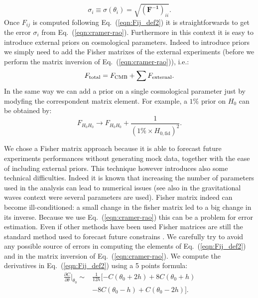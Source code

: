 \documentclass[aps,prd,reprint,superscriptaddress]{revtex4-1}
\newcommand\refeq[1]{Eq.~(\ref{eqn:#1})}
\begin{document}
\begin{equation}
\sigma_i \equiv \sigma (\theta_i) = \sqrt{(\mathbf{ F^{-1}})_{ii}}.
\label{eqn:cramer-rao}
\end{equation}
Once $F_{ij}$ is computed following \refeq{Fij_def2} it is straightforwards to get the error $\sigma_i$ from \refeq{cramer-rao}. Furthermore in this context it is easy to introduce external priors on cosmological parameters.
Indeed to introduce priors we simply need to add the Fisher matrixes of the external experiments (before we perform the matrix inversion of \refeq{cramer-rao}), i.e.:
\begin{equation}
F_{\rm total}=F_{\rm CMB}+\sum F_{\rm external}.
\end{equation}
In the same way we can add a prior on a single cosmological parameter just by modyfing the correspondent matrix element.
For example, a $1\%$ prior on $H_{0}$ can be obtained by:
\begin{equation}
F_{H_0 H_0} \rightarrow F_{H_0 H_0} + \frac{1}{(1\% \times H_{0,\text{fid}})^2}.
\end{equation}


We chose a Fisher matrix approach because it is able to forecast future experiments performances without generating mock data, together with the ease of including external priors. 
This technique however introduces also some technical difficulties. 
Indeed it is known \cite{2006astro.ph..9591A} that increasing the number of parameters used in the analysis can lead to numerical issues (see also \cite{2008PhRvD..77d2001V} in the gravitational waves context were several parameters are used).
Fisher matrix indeed can become ill-conditioned: a small change in the fisher matrix led to a big change in its inverse. Because we use \refeq{cramer-rao} this can be a problem for error estimation. 
Even if other methods have been used \cite{2006JCAP...10..013P,2006astro.ph..9591A} Fisher matrices are still the standard method used to forecast future constrains \cite{wu:2014}.
We carefully try to avoid any possible source of errors in computing the elements of \refeq{Fij_def2} and in the matrix inversion of \refeq{cramer-rao}.
We compute the derivatives in \refeq{Fij_def2} using a 5 points formula:
\begin{equation}
\begin{split}
\frac{\partial C}{\partial \theta}\bigg|_{\theta_{0}} \sim & \frac{1}{12 h} [ -C(\theta_{0}+2h)+ 8C(\theta_{0}+h) \\ &-8C(\theta_{0}-h)+C(\theta_{0}-2h)].
\end{split}
\label{eqn:deriv}
\end{equation}
\end{document}
